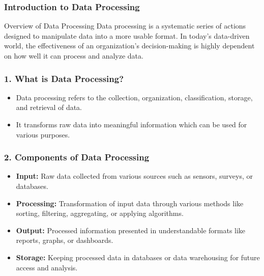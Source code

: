 \documentclass[aspectratio=169]{beamer}
\begin{document}
\frame{\titlepage}

\begin{frame}[fragile]
    \frametitle{Introduction to Data Processing}
    \begin{block}{Overview of Data Processing}
        Data processing is a systematic series of actions designed to manipulate data into a more usable format. In today's data-driven world, the effectiveness of an organization's decision-making is highly dependent on how well it can process and analyze data.
    \end{block}
\end{frame}

\begin{frame}[fragile]
    \frametitle{1. What is Data Processing?}
    \begin{itemize}
        \item Data processing refers to the collection, organization, classification, storage, and retrieval of data. 
        \item It transforms raw data into meaningful information which can be used for various purposes.
    \end{itemize}
\end{frame}

\begin{frame}[fragile]
    \frametitle{2. Components of Data Processing}
    \begin{itemize}
        \item \textbf{Input:} Raw data collected from various sources such as sensors, surveys, or databases.
        \item \textbf{Processing:} Transformation of input data through various methods like sorting, filtering, aggregating, or applying algorithms.
        \item \textbf{Output:} Processed information presented in understandable formats like reports, graphs, or dashboards.
        \item \textbf{Storage:} Keeping processed data in databases or data warehousing for future access and analysis.
    \end{itemize}
\end{frame}
\end{document}
